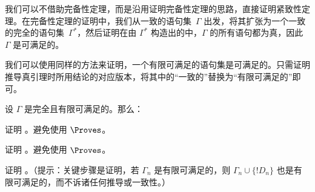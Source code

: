 \documentclass[../../../include/open-logic-section]{subfiles}
\begin{document}
      {}
      {}


我们可以不借助完备性定理，而是沿用证明完备性定理的思路，直接证明紧致性定理。在完备性定理的证明中，我们从一致的语句集~$\Gamma$ 出发，将其扩张为一个一致的完全的语句集~$\Gamma^*$，然后证明在由 $\Gamma^*$ 构造出的中，$\Gamma$ 的所有语句都为真，因此 $\Gamma$ 是可满足的。

我们可以使用同样的方法来证明，一个有限可满足的语句集是可满足的。只需证明推导真引理时所用结论的对应版本，将其中的“一致的”替换为“有限可满足的”即可。

\begin{prop}
设 $\Gamma$ 是完全且有限可满足的。那么：
\begin{enumerate}


\end{enumerate}
\end{prop}



\begin{prob}
证明 。避免使用 $\Proves$。
\end{prob}


\tagendprob



\begin{prob}
证明 。避免使用 $\Proves$。
\end{prob}


\tagendprob




\begin{prob}
证明 。（提示：关键步骤是证明，若 $\Gamma_n$ 是有限可满足的，则 $\Gamma_n
\cup \{!D_n\}$ 也是有限可满足的，而不诉诸任何推导或一致性。）
\end{prob}
\end{document}
